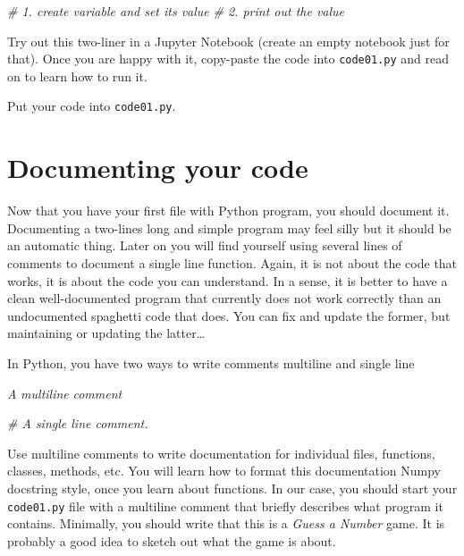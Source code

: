 \documentclass[
]{book}
\newenvironment{Shaded}{\begin{snugshade}}{\end{snugshade}}
\newcommand{\CommentTok}[1]{\textcolor[rgb]{0.56,0.35,0.01}{\textit{#1}}}
\begin{document}
\begin{Shaded}
\begin{Highlighting}[]
\CommentTok{\# 1. create variable and set its value}
\CommentTok{\# 2. print out the value}
\end{Highlighting}
\end{Shaded}

Try out this two-liner in a Jupyter Notebook (create an empty notebook just for that). Once you are happy with it, copy-paste the code into \texttt{code01.py} and read on to learn how to run it.

Put your code into \texttt{code01.py}.

\hypertarget{documenting-your-code}{%
\section{Documenting your code}\label{documenting-your-code}}

Now that you have your first file with Python program, you should document it. Documenting a two-lines long and simple program may feel silly but it should be an automatic thing. Later on you will find yourself using several lines of comments to document a single line function. Again, it is not about the code that works, it is about the code you can understand. In a sense, it is better to have a clean well-documented program that currently does not work correctly than an undocumented spaghetti code that does. You can fix and update the former, but maintaining or updating the latter\ldots{}

In Python, you have two ways to write comments multiline and single line

\begin{Shaded}
\begin{Highlighting}[]
\CommentTok{\textquotesingle{}\textquotesingle{}\textquotesingle{}}
\CommentTok{A }
\CommentTok{multiline }
\CommentTok{comment}
\CommentTok{\textquotesingle{}\textquotesingle{}\textquotesingle{}}

\CommentTok{\#  A single line comment.}
\end{Highlighting}
\end{Shaded}

Use multiline comments to write documentation for individual files, functions, classes, methods, etc. You will learn how to format this documentation Numpy docstring style, once you learn about functions. In our case, you should start your \texttt{code01.py} file with a multiline comment that briefly describes what program it contains. Minimally, you should write that this is a \emph{Guess a Number} game. It is probably a good idea to sketch out what the game is about.
\end{document}
